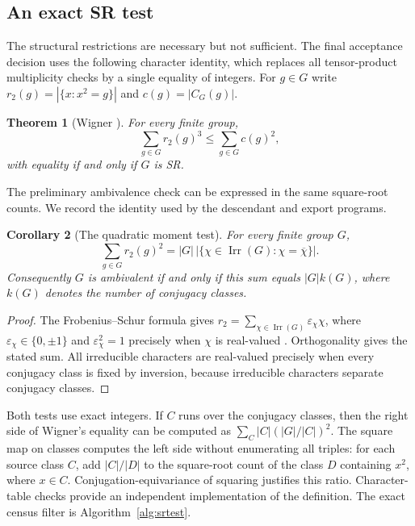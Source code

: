 \documentclass[11pt,a4paper]{amsart}
\newtheorem{thm}{Theorem}[section]
\newtheorem{corl}[thm]{Corollary}
\theoremstyle{definition}
\theoremstyle{remark}
\DeclareMathOperator{\Irr}{Irr}
\numberwithin{equation}{section}
\begin{document}
\subsection{An exact SR test}\label{subsec:exact-sr-test}
The structural restrictions are necessary but not sufficient. The final
acceptance decision uses the following character identity, which replaces
all tensor-product multiplicity checks by a single equality of integers.
For $g\in G$ write $r_2(g)=|\{x:x^2=g\}|$ and $c(g)=|C_G(g)|$.
\begin{thm}[Wigner {\cite[Theorem~2]{Wig41}}]\label{thm:wigner}
For every finite group,
\[
 \sum_{g\in G}r_2(g)^3\le\sum_{g\in G}c(g)^2,
\]
with equality if and only if $G$ is SR.
\end{thm}
The preliminary ambivalence check can be expressed in the same square-root
counts. We record the identity used by the descendant and export programs.
\begin{corl}[The quadratic moment test]\label{cor:ambivalence-moment}
For every finite group $G$,
\[
 \sum_{g\in G}r_2(g)^2
 =|G|\,|\{\chi\in\Irr(G):\chi=\overline\chi\}|.
\]
Consequently $G$ is ambivalent if and only if this sum equals $|G|k(G)$,
where $k(G)$ denotes the number of conjugacy classes.
\end{corl}
\begin{proof}
The Frobenius--Schur formula gives
$r_2=\sum_{\chi\in\Irr(G)}\varepsilon_\chi\chi$,
where $\varepsilon_\chi\in\{0,\pm1\}$ and
$\varepsilon_\chi^2=1$ precisely when $\chi$ is real-valued
\cite{Isa76}. Orthogonality gives the stated sum.
All irreducible characters are real-valued precisely when every
conjugacy class is fixed by inversion, because irreducible characters
separate conjugacy classes.
\end{proof}
Both tests use exact integers. If $C$ runs over the conjugacy classes,
then the right side of Wigner's equality can be computed as
$\sum_C |C|(|G|/|C|)^2$. The square map on classes computes the left
side without enumerating all triples: for each source class $C$, add
$|C|/|D|$ to the square-root count of the class $D$ containing $x^2$,
where $x\in C$. Conjugation-equivariance of squaring justifies this ratio.
Character-table checks provide an independent implementation of the definition.
The exact census filter is Algorithm~\ref{alg:srtest}.
\end{document}
